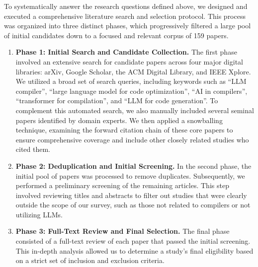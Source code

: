 \documentclass[pdflatex,sn-mathphys-ay,twocolumn, a4paper]{sn-jnl}%
\theoremstyle{thmstyleone}%
\theoremstyle{thmstyletwo}%
\theoremstyle{thmstylethree}%
\begin{document}
To systematically answer the research questions defined above, we designed and executed a comprehensive literature search and selection protocol. This process was organized into three distinct phases, which progressively filtered a large pool of initial candidates down to a focused and relevant corpus of 159 papers.
\begin{enumerate}
    \item \textbf{Phase 1: Initial Search and Candidate Collection.} The first phase involved an extensive search for candidate papers across four major digital libraries: arXiv, Google Scholar, the ACM Digital Library, and IEEE Xplore. We utilized a broad set of search queries, including keywords such as ``LLM compiler'', ``large language model for code optimization'', ``AI in compilers'', ``transformer for compilation'', and ``LLM for code generation''. To complement this automated search, we also manually included several seminal papers identified by domain experts. We then applied a snowballing technique, examining the forward citation chain of these core papers to ensure comprehensive coverage and include other closely related studies who cited them.
    \item \textbf{Phase 2: Deduplication and Initial Screening.} In the second phase, the initial pool of papers was processed to remove duplicates. Subsequently, we performed a preliminary screening of the remaining articles. This step involved reviewing titles and abstracts to filter out studies that were clearly outside the scope of our survey, such as those not related to compilers or not utilizing LLMs.
    \item \textbf{Phase 3: Full-Text Review and Final Selection.} The final phase consisted of a full-text review of each paper that passed the initial screening. This in-depth analysis allowed us to determine a study's final eligibility based on a strict set of inclusion and exclusion criteria. 


\end{enumerate}
\end{document}

